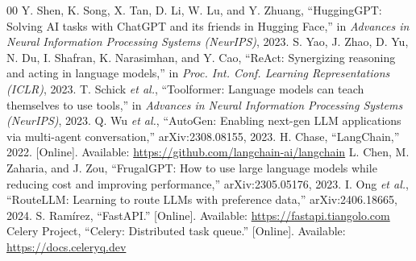 \documentclass[conference]{IEEEtran}
\begin{document}
\begin{thebibliography}{00}
 Y. Shen, K. Song, X. Tan, D. Li, W. Lu, and Y. Zhuang, ``HuggingGPT: Solving AI
tasks with ChatGPT and its friends in Hugging Face,'' in \textit{Advances in Neural Information
Processing Systems (NeurIPS)}, 2023.
 S. Yao, J. Zhao, D. Yu, N. Du, I. Shafran, K. Narasimhan, and Y. Cao, ``ReAct:
Synergizing reasoning and acting in language models,'' in \textit{Proc. Int. Conf. Learning
Representations (ICLR)}, 2023.
 T. Schick \textit{et al.}, ``Toolformer: Language models can teach themselves to use
tools,'' in \textit{Advances in Neural Information Processing Systems (NeurIPS)}, 2023.
 Q. Wu \textit{et al.}, ``AutoGen: Enabling next-gen LLM applications via multi-agent
conversation,'' arXiv:2308.08155, 2023.
 H. Chase, ``LangChain,'' 2022. [Online]. Available:
\url{https://github.com/langchain-ai/langchain}
 L. Chen, M. Zaharia, and J. Zou, ``FrugalGPT: How to use large language models while
reducing cost and improving performance,'' arXiv:2305.05176, 2023.
 I. Ong \textit{et al.}, ``RouteLLM: Learning to route LLMs with preference data,''
arXiv:2406.18665, 2024.
 S. Ram\'irez, ``FastAPI.'' [Online]. Available: \url{https://fastapi.tiangolo.com}
 Celery Project, ``Celery: Distributed task queue.'' [Online]. Available:
\url{https://docs.celeryq.dev}
\end{thebibliography}
\end{document}
